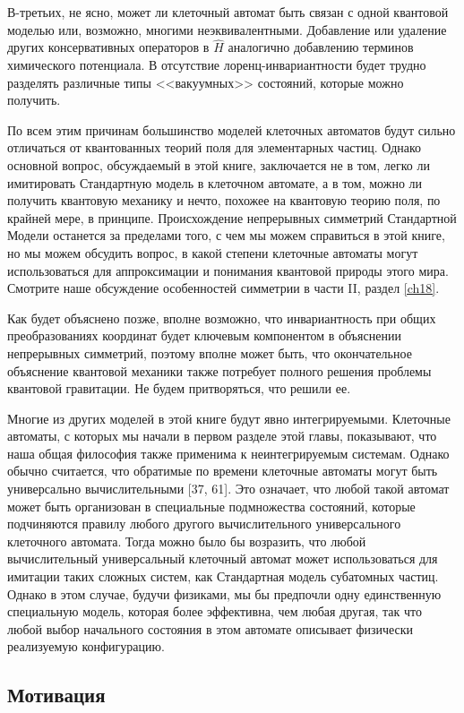 \documentclass[main.tex]{subfiles}
\begin{document}
В-третьих, не ясно, может ли клеточный автомат быть связан с одной квантовой моделью или, возможно, многими неэквивалентными. Добавление или удаление других консервативных операторов в $\hat H$ аналогично добавлению терминов химического потенциала. В отсутствие лоренц-инвариантности будет трудно разделять различные типы <<вакуумных>> состояний, которые можно получить.

По всем этим причинам большинство моделей клеточных автоматов будут сильно отличаться от квантованных теорий поля для элементарных частиц. Однако основной вопрос, обсуждаемый в этой книге, заключается не в том, легко ли имитировать Стандартную модель в клеточном автомате, а в том, можно ли получить квантовую механику и нечто, похожее на квантовую теорию поля, по крайней мере, в принципе. Происхождение непрерывных симметрий Стандартной Модели останется за пределами того, с чем мы можем справиться в этой книге, но мы можем обсудить вопрос, в какой степени клеточные автоматы могут использоваться для аппроксимации и понимания квантовой природы этого мира. Смотрите наше обсуждение особенностей симметрии в части II, раздел \ref{ch18}.

Как будет объяснено позже, вполне возможно, что инвариантность при общих преобразованиях координат будет ключевым компонентом в объяснении непрерывных симметрий, поэтому вполне может быть, что окончательное объяснение квантовой механики также потребует полного решения проблемы квантовой гравитации. Не будем притворяться, что решили ее.

Многие из других моделей в этой книге будут явно интегрируемыми. Клеточные автоматы, с которых мы начали в первом разделе этой главы, показывают, что наша общая философия также применима к неинтегрируемым системам. Однако обычно считается, что обратимые по времени клеточные автоматы могут быть универсально вычислительными [37, 61]. Это означает, что любой такой автомат может быть организован в специальные подмножества состояний, которые подчиняются правилу любого другого вычислительного универсального клеточного автомата. Тогда можно было бы возразить, что любой вычислительный универсальный клеточный автомат может использоваться для имитации таких сложных систем, как Стандартная модель субатомных частиц. Однако в этом случае, будучи физиками, мы бы предпочли одну единственную специальную модель, которая более эффективна, чем любая другая, так что любой выбор начального состояния в этом автомате описывает физически реализуемую конфигурацию.


\subsection{Мотивация}\label{ch5.3}
\end{document}
